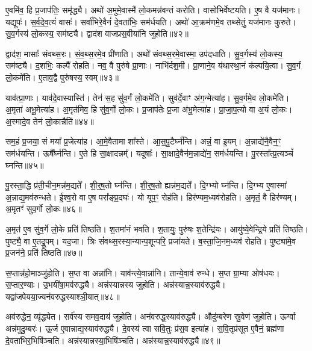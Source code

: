 ए॒वमि॑व॒ हि प्र॒जा\-प॑तिः॒ समृ॑द्ध्यै।
अथो॑ अ॒मुमे॒वास्मै॑ लो॒कमन्न॑वन्तं करोति।
वासो॑भिर्वेष्टयति।
ए॒ष वै यज॑मानः।
यद्यूपः॑।
स॒र्व॒दे॒व॒त्यं॑ वासः॑।
सर्वा॑भिरे॒वैनं॑ दे॒वता॑भिः॒ सम॑र्धयति।
अथो॑ आ॒क्रम॑णमे॒व तथ्सेतुं॒ यज॑मानः कुरुते।
सु॒व॒र्गस्य॑ लो॒कस्य॒ सम॑ष्ट्यै।
द्वाद॑श वाजप्रस॒वीया॑नि जुहोति॥४२॥

द्वाद॑श॒ मासाः᳚ संवथ्स॒रः।
सं॒व॒थ्स॒रमे॒व प्री॑णाति।
अथो॑ संवथ्स॒र\-मे॒वास्मा॒ उप॑दधाति।
सु॒व॒र्गस्य॑ लो॒कस्य॒ सम॑ष्ट्यै।
द॒शभिः॒ कल्पै॑ रोहति।
नव॒ वै पुरु॑षे प्रा॒णाः।
नाभि॑र्दश॒मी।
प्रा॒णाने॒व य॑था\-स्था॒नं क॑ल्पयि॒त्वा।
सु॒व॒र्गं लो॒कमे॑ति।
ए॒ताव॒द्वै पुरु॑षस्य॒ स्वम्॥४३॥

याव॑त्प्रा॒णाः।
याव॑दे॒वास्यास्ति॑।
तेन॑ स॒ह सु॑व॒र्गं लो॒कमे॑ति।
सुव॑र्दे॒वाꣳ अ॑ग॒न्मेत्या॑ह।
सु॒व॒र्गमे॒व लो॒कमे॑ति।
अ॒मृता॑ अभू॒मेत्या॑ह।
अ॒मृत॑मिव॒ हि सु॑व॒र्गो लो॒कः।
प्र॒जा\-प॑तेः प्र॒जा अ॑भू॒मेत्या॑ह।
प्रा॒जा॒प॒त्यो वा अ॒यं लो॒कः।
अ॒स्मादे॒व तेन॑ लो॒कान्नैति॑॥४४॥

सम॒हं प्र॒जया॒ सं मया᳚ प्र॒जेत्या॑ह।
आ॒\-मे॒वैतामा शा᳚स्ते।
आ॒स॒पु॒टैर्घ्न॑न्ति।
अन्नं॒ वा इ॒यम्।
अ॒न्नाद्ये॑नै॒वैन॒ꣳ॒ सम॑र्धयन्ति।
ऊषै᳚र्घ्नन्ति।
ए॒ते हि सा॒क्षादन्नम्᳚।
यदूषाः᳚।
सा॒क्षादे॒वैन॑म॒न्नाद्ये॑न॒ सम॑र्धयन्ति।
पु॒रस्ता᳚त्प्र॒त्यञ्चं᳚ घ्नन्ति॥४५॥

पु॒रस्ता॒द्धि प्र॑ती॒चीन॒मन्न॑म॒द्यते᳚।
शी॒र्॒ष॒तो घ्न॑न्ति।
शी॒र्॒ष॒तो ह्यन्न॑म॒द्यते᳚।
दि॒ग्भ्यो घ्न॑न्ति।
दि॒ग्भ्य ए॒वास्मा॑ अ॒न्नाद्य॒मव॑रुन्धते।
ई॒श्व॒रो वा ए॒ष परा᳚ङ्प्र॒दघः॑।
यो यूप॒ꣳ॒ रोह॑ति।
हिर॑ण्यम॒ध्यव॑रोहति।
अ॒मृतं॒ वै हिर॑ण्यम्।
अ॒मृतꣳ॑ सुव॒र्गो लो॒कः॥४६॥

अ॒मृत॑ ए॒व सु॑व॒र्गे लो॒के प्रति॑ तिष्ठति।
श॒तमा॑नं भवति।
श॒तायुः॒ पुरु॑षः श॒तेन्द्रि॑यः।
आयु॑ष्ये॒वेन्द्रि॒ये प्रति॑ तिष्ठति।
पुष्ट्यै॒ वा ए॒तद्रू॒पम्।
यद॒जा।
त्रिः सं॑वथ्स॒रस्या॒न्यान्प॒शून्परि॒ प्रजा॑यते।
ब॒स्ता॒जि॒नम॒ध्यव॑ रोहति।
पुष्ट्या॑मे॒व प्र॒जन॑ने॒ प्रति॑ तिष्ठति॥४७॥\anuvakamend[प॒रि॒धा॒पय॑ति गो॒धूमा॑ जुहोति॒ स्वं नैति॑ प्र॒त्यञ्चं᳚ घ्नन्ति लो॒को नव॑ च]

स॒प्तान्न॑हो॒माञ्जु॑होति।
स॒प्त वा अन्ना॑नि।
याव॑न्त्ये॒वान्ना॑नि।
तान्ये॒वाव॑ रुन्धे।
स॒प्त ग्रा॒म्या ओष॑धयः।
स॒प्तार॒ण्याः।
उ॒भयी॑षा॒मव॑रुद्ध्यै।
अन्न॑स्यान्नस्य जुहोति।
अन्न॑स्यान्न॒स्या\-व॑रुद्ध्यै।
यद्वा॑जपेयया॒ज्यन॑वरुद्धस्याश्ञी॒यात्॥४८॥

अव॑रुद्धेन॒ व्यृ॑द्ध्येत।
सर्व॑स्य समव॒दाय॑ जुहोति।
अन॑वरुद्ध॒स्याव॑रुद्ध्यै।
औदु॑म्बरेण स्रु॒वेण॑ जुहोति।
ऊर्ग्वा अन्न॑मुदु॒म्बरः॑।
ऊ॒र्ज ए॒वान्नाद्य॒स्याव॑रुद्ध्यै।
दे॒वस्य॑ त्वा सवि॒तुः प्र॑स॒व इत्या॑ह।
स॒वि॒तृप्र॑सूत ए॒वैनं॒ ब्रह्म॑णा दे॒वता॑भिर॒भिषि॑ञ्चति।
अन्न॑स्यान्नस्या॒भिषि॑ञ्चति।
अन्न॑स्यान्न॒स्याव॑रुद्ध्यै॥४९॥


